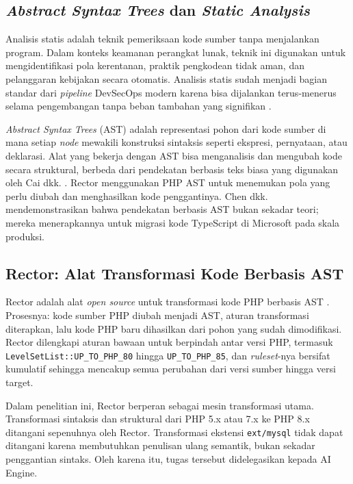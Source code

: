     \subsection{\textit{Abstract Syntax Trees} dan \textit{Static Analysis}}

    Analisis statis adalah teknik pemeriksaan kode sumber tanpa menjalankan program. Dalam konteks keamanan perangkat lunak, teknik ini digunakan untuk mengidentifikasi pola kerentanan, praktik pengkodean tidak aman, dan pelanggaran kebijakan secara otomatis. Analisis statis sudah menjadi bagian standar dari \textit{pipeline} DevSecOps modern karena bisa dijalankan terus-menerus selama pengembangan tanpa beban tambahan yang signifikan \cite{iso27001_2022}.

    \textit{Abstract Syntax Trees} (AST) adalah representasi pohon dari kode sumber di mana setiap \textit{node} mewakili konstruksi sintaksis seperti ekspresi, pernyataan, atau deklarasi. Alat yang bekerja dengan AST bisa menganalisis dan mengubah kode secara struktural, berbeda dari pendekatan berbasis teks biasa yang digunakan oleh Cai dkk. \cite{cai2015pattern}. Rector menggunakan PHP AST untuk menemukan pola yang perlu diubah dan menghasilkan kode penggantinya. Chen dkk. \cite{chen2022ast} mendemonstrasikan bahwa pendekatan berbasis AST bukan sekadar teori; mereka menerapkannya untuk migrasi kode TypeScript di Microsoft pada skala produksi.

    \subsection{Rector: Alat Transformasi Kode Berbasis AST}
    \label{subsec:rector}

    Rector adalah alat \textit{open source} untuk transformasi kode PHP berbasis AST \cite{rector2024}. Prosesnya: kode sumber PHP diubah menjadi AST, aturan transformasi diterapkan, lalu kode PHP baru dihasilkan dari pohon yang sudah dimodifikasi. Rector dilengkapi aturan bawaan untuk berpindah antar versi PHP, termasuk \texttt{LevelSetList::UP\_TO\_PHP\_80} hingga 
    \texttt{UP\_TO\_PHP\_85}, dan \textit{ruleset}-nya bersifat kumulatif sehingga mencakup semua perubahan dari versi sumber hingga versi target.

    Dalam penelitian ini, Rector berperan sebagai mesin transformasi utama. Transformasi sintaksis dan struktural dari PHP 5.x atau 7.x ke PHP 8.x ditangani sepenuhnya oleh Rector. Transformasi ekstensi \texttt{ext/mysql} tidak dapat ditangani karena membutuhkan penulisan ulang semantik, bukan sekadar penggantian sintaks. Oleh karena itu, tugas tersebut didelegasikan kepada AI Engine.

